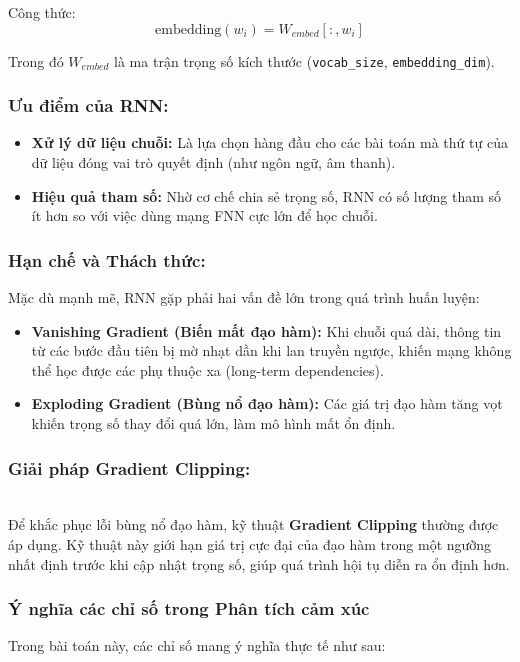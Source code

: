 Công thức:
\begin{equation}
    \text{embedding}(w_i) = W_{embed}[:, w_i]
\end{equation}

Trong đó $W_{embed}$ là ma trận trọng số kích thước (\texttt{vocab\_size}, \texttt{embedding\_dim}).

\subsubsection{Ưu điểm của RNN:}
\begin{itemize}
    \item \textbf{Xử lý dữ liệu chuỗi:} Là lựa chọn hàng đầu cho các bài toán mà thứ tự của dữ liệu đóng vai trò quyết định (như ngôn ngữ, âm thanh).
    \item \textbf{Hiệu quả tham số:} Nhờ cơ chế chia sẻ trọng số, RNN có số lượng tham số ít hơn so với việc dùng mạng FNN cực lớn để học chuỗi.
\end{itemize}

\subsubsection{Hạn chế và Thách thức:}
Mặc dù mạnh mẽ, RNN gặp phải hai vấn đề lớn trong quá trình huấn luyện:
\begin{itemize}
    \item \textbf{Vanishing Gradient (Biến mất đạo hàm):} Khi chuỗi quá dài, thông tin từ các bước đầu tiên bị mờ nhạt dần khi lan truyền ngược, khiến mạng không thể học được các phụ thuộc xa (long-term dependencies).
    \item \textbf{Exploding Gradient (Bùng nổ đạo hàm):} Các giá trị đạo hàm tăng vọt khiến trọng số thay đổi quá lớn, làm mô hình mất ổn định.
\end{itemize}

\subsubsection{Giải pháp Gradient Clipping:} \hfill \\
Để khắc phục lỗi bùng nổ đạo hàm, kỹ thuật \textbf{Gradient Clipping} thường được áp dụng. Kỹ thuật này giới hạn giá trị cực đại của đạo hàm trong một ngưỡng nhất định trước khi cập nhật trọng số, giúp quá trình hội tụ diễn ra ổn định hơn.


\subsubsection{Ý nghĩa các chỉ số trong Phân tích cảm xúc}
Trong bài toán này, các chỉ số mang ý nghĩa thực tế như sau:

